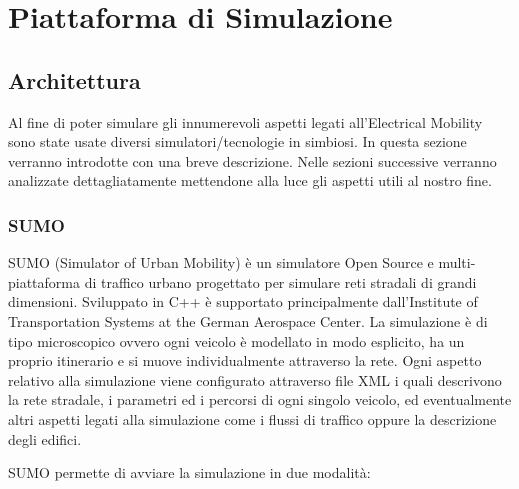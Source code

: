 \chapter{Piattaforma di Simulazione}\label{chap:sim}

\section{Architettura}

Al fine di poter simulare gli innumerevoli aspetti legati all'Electrical Mobility sono state usate diversi simulatori/tecnologie in simbiosi. In questa sezione verranno introdotte con una breve descrizione. Nelle sezioni successive verranno analizzate dettagliatamente mettendone alla luce gli aspetti utili al nostro fine.

\subsection{SUMO}\label{sebsec:sumo}

SUMO (Simulator of Urban Mobility) è un simulatore Open Source e multi-piattaforma di traffico urbano progettato per simulare reti stradali di grandi dimensioni. Sviluppato in C++ è supportato principalmente dall'Institute of Transportation Systems at the German Aerospace Center. La simulazione è di tipo microscopico ovvero ogni veicolo è modellato in modo esplicito, ha un proprio itinerario e si muove individualmente attraverso la rete. Ogni aspetto relativo alla simulazione viene configurato attraverso file XML i quali descrivono la rete stradale, i parametri ed i percorsi di ogni singolo veicolo, ed eventualmente altri aspetti legati alla simulazione come i flussi di traffico oppure la descrizione degli edifici. 

SUMO permette di avviare la simulazione in due modalità:

